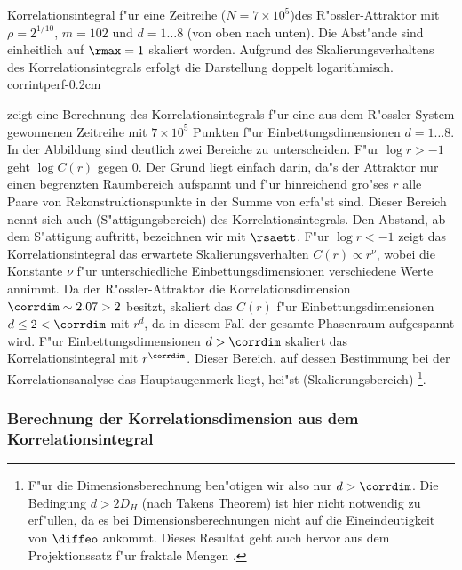 {Korrelationsintegral f"ur eine Zeitreihe ($N=7\times 10^5$)des R"ossler-Attraktor mit $\rho=2^{1/10}$,
$m=102$ und $d=1\dots 8$ (von oben nach unten). Die Abst"ande sind einheitlich auf
$\rmax=1$ skaliert worden. Aufgrund des Skalierungsverhaltens des
Korrelationsintegrals erfolgt die Darstellung doppelt logarithmisch.} 
{corrintperf}{-0.2cm}

 zeigt eine Berechnung des Korrelationsintegrals f"ur eine aus dem
R"ossler-System \cite{Roessler76} gewonnenen Zeitreihe mit $7\times 10^5$ Punkten 
f"ur Einbettungsdimensionen $d=1\dots 8$. In der Abbildung sind deutlich zwei Bereiche zu
unterscheiden. F"ur $\log r>-1$ geht $\log C(r)$ gegen 0. Der Grund liegt einfach
darin, da"s der Attraktor nur einen begrenzten Raumbereich aufspannt und f"ur hinreichend
gro"ses $r$ alle Paare von Rekonstruktionspunkte  in der Summe von 
erfa"st sind. Dieser Bereich nennt sich auch \begriff(S"attigungsbereich) des
Korrelationsintegrals. Den Abstand, ab dem S"attigung auftritt, bezeichnen wir mit
$\rsaett$. F"ur $\log r<-1$ zeigt das Korrelationsintegral das 
 erwartete Skalierungsverhalten $C(r)\propto r^\nu$, wobei die Konstante
$\nu$ f"ur unterschiedliche Einbettungsdimensionen verschiedene Werte annimmt. Da der
R"ossler-Attraktor die Korrelationsdimension $\corrdim\sim 2.07>2$ besitzt, skaliert das $C(r)$
f"ur Einbettungsdimensionen $d\leq 2<\corrdim$ mit $r^d$, da in diesem Fall der gesamte Phasenraum
aufgespannt wird. F"ur Einbettungsdimensionen $d>\corrdim$ skaliert das Korrelationsintegral
mit $r^{\corrdim}$. Dieser Bereich, auf dessen Bestimmung bei der Korrelationsanalyse das
Hauptaugenmerk liegt, hei"st \begriff(Skalierungsbereich)
\footnote{F"ur die Dimensionsberechnung ben"otigen wir also nur $d>\corrdim$. Die Bedingung
$d>2D_H$ (nach Takens Theorem) ist hier nicht notwendig zu erf"ullen, da es bei
Dimensionsberechnungen nicht auf die Eineindeutigkeit von $\diffeo$ ankommt. Dieses Resultat geht
auch hervor aus dem Projektionssatz f"ur fraktale Mengen \cite{Falconer93}.}.

\subsubsection{Berechnung der Korrelationsdimension aus dem Korrelationsintegral}
